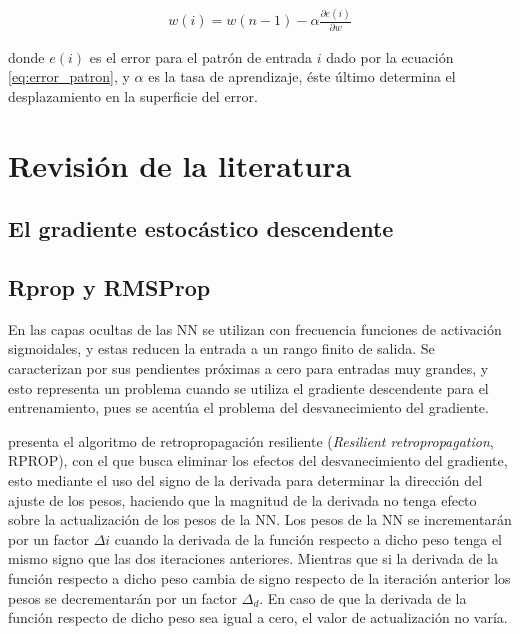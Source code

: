 \begin{eqnarray}
	w(i) = w(n - 1) - \alpha\frac{\partial e(i)}{\partial w}
\end{eqnarray}

donde $e(i)$ es el error para el patrón de entrada $i$ dado por la ecuación \ref{eq:error_patron}, y $\alpha$ es la tasa de aprendizaje, éste último determina el desplazamiento en la superficie del error.





\section{Revisión de la literatura}
\subsection{El gradiente estocástico descendente}
\subsection{Rprop y RMSProp}
En las capas ocultas de las NN se utilizan con frecuencia funciones de activación sigmoidales, y estas reducen la entrada a un rango finito de salida. Se caracterizan por sus pendientes próximas a cero para entradas muy grandes, y esto representa un problema cuando se utiliza el gradiente descendente para el entrenamiento, pues se acentúa el problema del desvanecimiento del gradiente.

 presenta el algoritmo de retropropagación resiliente ({\em Resilient retropropagation}, RPROP), con el que busca eliminar los efectos del desvanecimiento del gradiente, esto mediante el uso del signo de la derivada para determinar la dirección del ajuste de los pesos, haciendo que la magnitud de la derivada no tenga efecto sobre la actualización de los pesos de la NN. Los pesos de la NN se incrementarán por un factor $\Delta{i}$ cuando la derivada de la función respecto a dicho peso tenga el mismo signo que las dos iteraciones anteriores. Mientras que si la derivada de la función respecto a dicho peso cambia de signo respecto de la iteración anterior los pesos se decrementarán por un factor $\Delta_{d}$. En caso de que la derivada de la función respecto de dicho peso sea igual a cero, el valor de actualización no varía.

